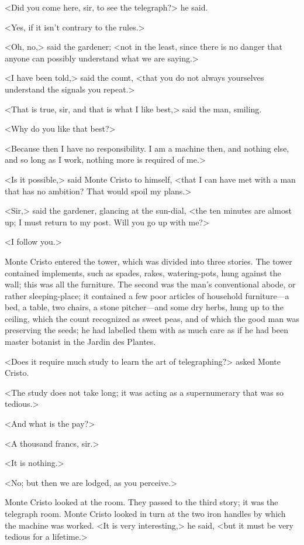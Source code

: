  <Did you come here, sir, to see the telegraph?> he said. 

 <Yes, if it isn't contrary to the rules.> 

 <Oh, no,> said the gardener; <not in the least, since there is no danger that anyone can possibly understand what we are saying.> 

 <I have been told,> said the count, <that you do not always yourselves understand the signals you repeat.> 

 <That is true, sir, and that is what I like best,> said the man, smiling. 

 <Why do you like that best?> 

 <Because then I have no responsibility. I am a machine then, and nothing else, and so long as I work, nothing more is required of me.> 

 <Is it possible,> said Monte Cristo to himself, <that I can have met with a man that has no ambition? That would spoil my plans.> 

 <Sir,> said the gardener, glancing at the sun-dial, <the ten minutes are almost up; I must return to my post. Will you go up with me?> 

 <I follow you.> 

 Monte Cristo entered the tower, which was divided into three stories. The tower contained implements, such as spades, rakes, watering-pots, hung against the wall; this was all the furniture. The second was the man's conventional abode, or rather sleeping-place; it contained a few poor articles of household furniture—a bed, a table, two chairs, a stone pitcher—and some dry herbs, hung up to the ceiling, which the count recognized as sweet peas, and of which the good man was preserving the seeds; he had labelled them with as much care as if he had been master botanist in the Jardin des Plantes. 

 <Does it require much study to learn the art of telegraphing?> asked Monte Cristo. 

 <The study does not take long; it was acting as a supernumerary that was so tedious.> 

 <And what is the pay?> 

 <A thousand francs, sir.> 

 <It is nothing.> 

 <No; but then we are lodged, as you perceive.> 

 Monte Cristo looked at the room. They passed to the third story; it was the telegraph room. Monte Cristo looked in turn at the two iron handles by which the machine was worked. <It is very interesting,> he said, <but it must be very tedious for a lifetime.> 

